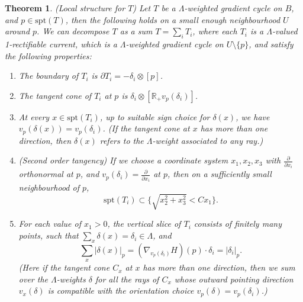 \documentclass{article}
\newtheorem{thm}{Theorem}[section]
\theoremstyle{definition}
\newcommand{\R}{\mathbb{R}}
\begin{document}
	\begin{thm}\label{thm:localstructure}
		(Local structure for $T$) 
	Let $T$ be a $\Lambda$-weighted gradient cycle on $B$, and $p\in \text{spt}(T)$, then
	the following holds on a small enough neighbourhood $U$ around $p$. We can decompose $T$ as a sum $T= \sum_i T_i$, where each $T_i$ is a $\Lambda$-valued 1-rectifiable current, which is a $\Lambda$-weighted gradient cycle on $U\setminus \{ p\}$, and satisfy the following properties:
		\begin{enumerate}
			\item  The boundary of $T_i$ is $\partial T_i= - \delta_i \otimes [p]$.
			
			\item  The tangent cone of $T_i$ at $p$ is $  \delta_i\otimes   [\R_+ v_p(\delta_i)]  $.
			
			
		
			
		
			
			
			
			\item   At every $x\in \text{spt}(T_i)$, up to suitable sign choice for $\delta(x)$, we have
			$v_p(\delta(x))= v_p(\delta_i)$. (If  the tangent cone at $x$ has more than one direction, then $\delta(x)$ refers to the $\Lambda$-weight associated to any ray.)
			
			
			
				\item (Second order tangency) If we choose a coordinate system $x_1, x_2, x_3$ with $\frac{\partial}{\partial x_i}$ orthonormal at $p$, and $v_p(\delta_i)= \frac{\partial}{\partial x_i}$ at $p$, then on a sufficiently small neighbourhood of $p$,
			\[
			\text{spt}(T_i)\subset \{     \sqrt{x_2^2+x_3^2} < C x_1       \}.
			\]
			

			\item  For each value of $x_1>0$, the vertical slice of $T_i$ consists of finitely many points, such that $\sum_x \delta(x)=\delta_i \in \Lambda$, and
				\[
			\sum_x  |\delta(x)|_p = (\nabla_{ v_p(\delta_i)} H)(p)\cdot \delta_i= |\delta_i |_p. 
			\]
			(Here if the tangent cone $C_x$ at $x$ has more than one direction, then we sum over the  $\Lambda$-weights $\delta$ for all the rays of $C_x$ whose outward pointing direction $v_x(\delta)$ is compatible with the orientation choice $v_p(\delta)=v_p(\delta_i)$.)
			
			
		\end{enumerate}
	\end{thm}
			
			
			
\end{document}
